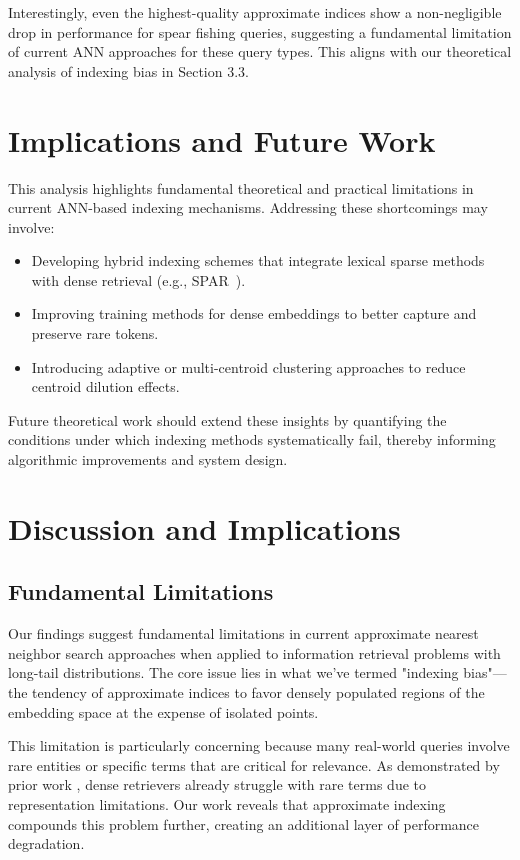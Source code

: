 \documentclass[sigconf,review]{acmart}
\begin{document}
Interestingly, even the highest-quality approximate indices show a non-negligible drop in performance for spear fishing queries, suggesting a fundamental limitation of current ANN approaches for these query types. This aligns with our theoretical analysis of indexing bias in Section 3.3.

\section{Implications and Future Work}

This analysis highlights fundamental theoretical and practical limitations in current ANN-based indexing mechanisms. Addressing these shortcomings may involve:

\begin{itemize}
  \item Developing hybrid indexing schemes that integrate lexical sparse methods with dense retrieval (e.g., SPAR~\cite{chen2022salient}).
  \item Improving training methods for dense embeddings to better capture and preserve rare tokens.
  \item Introducing adaptive or multi-centroid clustering approaches to reduce centroid dilution effects.
\end{itemize}

Future theoretical work should extend these insights by quantifying the conditions under which indexing methods systematically fail, thereby informing algorithmic improvements and system design.

\section{Discussion and Implications}
\subsection{Fundamental Limitations}
Our findings suggest fundamental limitations in current approximate nearest neighbor search approaches when applied to information retrieval problems with long-tail distributions. The core issue lies in what we've termed "indexing bias"—the tendency of approximate indices to favor densely populated regions of the embedding space at the expense of isolated points.

This limitation is particularly concerning because many real-world queries involve rare entities or specific terms that are critical for relevance. As demonstrated by prior work \cite{sciavolino2021entityquestions, zhou2023tower}, dense retrievers already struggle with rare terms due to representation limitations. Our work reveals that approximate indexing compounds this problem further, creating an additional layer of performance degradation.
\end{document}
